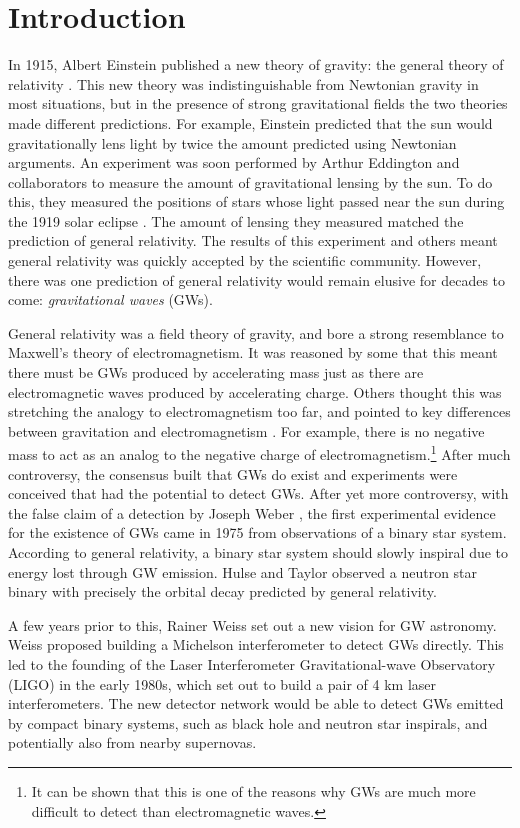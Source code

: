 \documentclass[11pt]{cuthesis}
\begin{document}
\chapter{Introduction}
In 1915, Albert Einstein published a new theory of gravity: the general theory of relativity \cite{einstein_gr}. This new theory was indistinguishable from Newtonian gravity in most situations, but in the presence of strong gravitational fields the two theories made different predictions. For example, Einstein predicted that the sun would gravitationally lens light by twice the amount predicted using Newtonian arguments. An experiment was soon performed by Arthur Eddington and collaborators to measure the amount of gravitational lensing by the sun. To do this, they measured the positions of stars whose light passed near the sun during the 1919 solar eclipse \cite{eclipse1919}. The amount of lensing they measured matched the prediction of general relativity. The results of this experiment and others meant general relativity was quickly accepted by the scientific community. However, there was one prediction of general relativity would remain elusive for decades to come: \textit{gravitational waves} (GWs). 

General relativity was a field theory of gravity, and bore a strong resemblance to Maxwell's theory of electromagnetism. \cite{maxwell} It was reasoned by some that this meant there must be GWs produced by accelerating mass just as there are electromagnetic waves produced by accelerating charge. Others thought this was stretching the analogy to electromagnetism too far, and pointed to key differences between gravitation and electromagnetism \cite{thoughtspeed}. For example, there is no negative mass to act as an analog to the negative charge of electromagnetism.\footnote{It can be shown that this is one of the reasons why GWs are much more difficult to detect than electromagnetic waves.} After much controversy, the consensus built that GWs do exist and experiments were conceived that had the potential to detect GWs. After yet more controversy, with the false claim of a detection by Joseph Weber \cite{weber}, the first experimental evidence for the existence of GWs came in 1975 from observations of a binary star system. According to general relativity, a binary star system should slowly inspiral due to energy lost through GW emission. Hulse and Taylor observed a neutron star binary with precisely the orbital decay predicted by general relativity. \cite{Hulse} 

A few years prior to this, Rainer Weiss set out a new vision for GW astronomy. Weiss proposed building a Michelson interferometer to detect GWs directly. \cite{weiss72} This led to the founding of the Laser Interferometer Gravitational-wave Observatory (LIGO) in the early 1980s, which set out to build a pair of 4 km laser interferometers. The new detector network would be able to detect GWs emitted by compact binary systems, such as black hole and neutron star inspirals, and potentially also from nearby supernovas. 
\end{document}
